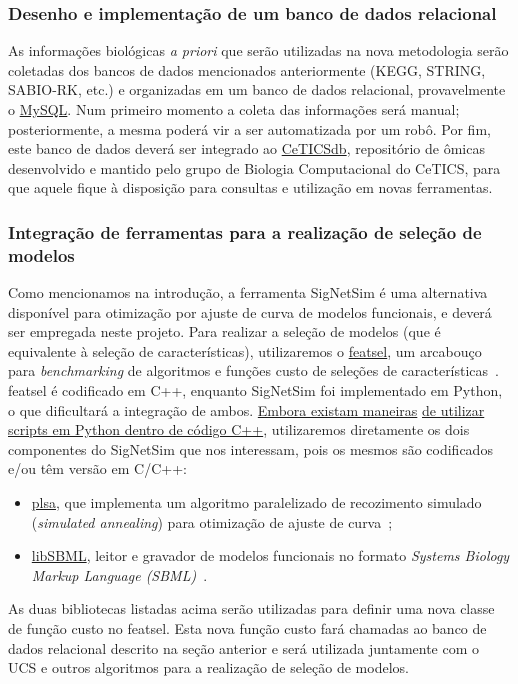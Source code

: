\documentclass[12pt]{article}
\begin{document}
\subsubsection{Desenho e implementação de um banco de dados relacional}

As informações biológicas {\em a priori} que serão utilizadas na nova metodologia serão coletadas dos bancos de dados mencionados anteriormente (KEGG, STRING, SABIO-RK, etc.) e organizadas em um banco de dados relacional, provavelmente o \href{https://www.mysql.com/}{MySQL}. Num primeiro momento a coleta das informações será manual; posteriormente, a mesma poderá vir a ser automatizada por um robô. Por fim, este banco de dados deverá ser integrado ao \href{http://cetics.butantan.gov.br/ceticsdb/accounts/login/?next=/ceticsdb/}{CeTICSdb}, repositório de ômicas desenvolvido e mantido pelo grupo de Biologia Computacional do CeTICS, para que aquele fique à disposição para consultas e utilização em novas ferramentas.


\subsubsection{Integração de ferramentas para a realização de seleção de modelos}

%
Como mencionamos na introdução, a ferramenta SigNetSim é uma alternativa disponível para otimização por ajuste de curva de modelos funcionais, e deverá ser empregada neste projeto. Para realizar a seleção de modelos (que é equivalente à seleção de características), utilizaremos o \href{https://github.com/msreis/featsel}{featsel}, um arcabouço para {\em benchmarking} de algoritmos e funções custo de seleções de características~\cite{Reis2017featsel}. featsel é codificado em C++, enquanto SigNetSim foi implementado em Python, o que dificultará a integração de ambos. \href{https://docs.python.org/2/extending/embedding.html}{Embora existam maneiras} \href{https://docs.python.org/2/extending/embedding.html}{de utilizar scripts em Python dentro de código C++}, utilizaremos diretamente os dois componentes do SigNetSim que nos interessam, pois os mesmos são codificados e/ou têm versão em C/C++:
\begin{itemize}
\item \href{https://github.com/vincent-noel/plsa}{plsa}, que implementa um algoritmo paralelizado de recozimento simulado ({\em simulated annealing}) para otimização de ajuste de curva~\cite{chu1999parallel};
\item \href{http://sbml.org/Software/libSBML}{libSBML}, leitor e gravador de modelos funcionais no formato {\em Systems Biology Markup Language (SBML)}~\cite{hucka2003systems}.
\end{itemize}
As duas bibliotecas listadas acima serão utilizadas para definir uma nova classe de função custo no featsel. Esta nova função custo fará chamadas ao banco de dados relacional descrito na seção anterior e será utilizada juntamente com o UCS e outros algoritmos para a realização de seleção de modelos.
\end{document}
